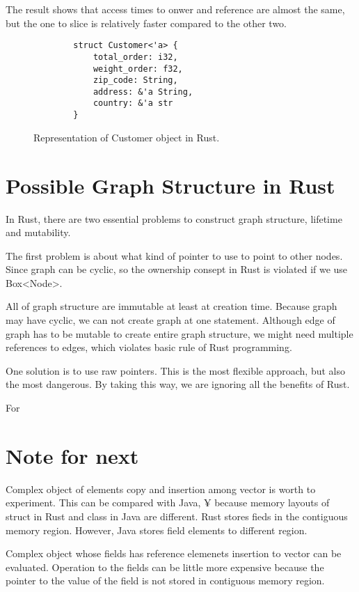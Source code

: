 The result shows that access times to onwer and reference are almost the same, but the one to slice is relatively faster 
compared to the other two.


\begin{figure}[htb]
    \begin{lstlisting}
        struct Customer<'a> {
            total_order: i32,
            weight_order: f32,
            zip_code: String,
            address: &'a String,
            country: &'a str
        }
    \end{lstlisting}
    \caption{Representation of Customer object in Rust.}
    \label{fig:Sampling}
\end{figure}




\section{Possible Graph Structure in Rust}
\label{sec:history}
In Rust, there are two essential problems to construct graph structure, lifetime and mutability. 

The first problem is about what kind of pointer to use to point to other nodes. 
Since graph can be cyclic, so the ownership consept in Rust is violated if we use Box<Node>.

All of graph structure are immutable at least at creation time. Because graph may have cyclic, 
we can not create graph at one statement. Although edge of graph has to be mutable to create entire graph structure, 
we might need multiple references to edges, which violates basic rule of Rust programming.

One solution is to use raw pointers. This is the most flexible approach, but also the most dangerous. 
By taking this way, we are ignoring all the benefits of Rust.

For 


\section{Note for next}
\label{sec:history}
Complex object of elements copy and insertion among vector is worth to experiment. This can be compared with Java, ¥
because memory layouts of struct in Rust and class in Java are different. Rust stores fieds in the contiguous memory region. 
However, Java stores field elements to different region.

Complex object whose fields has reference elemenets insertion to vector can be evaluated. Operation to the fields can be little 
more expensive because the pointer to the value of the field is not stored in contiguous memory region.


